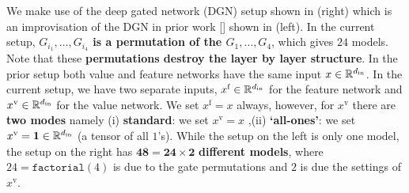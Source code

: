 We make use of the deep gated network (DGN) setup shown in  (right) which is an improvisation of the DGN in prior work [] shown in  (left). In the current setup, {\bf{$G_{i_1},\ldots,G_{i_4}$ is a permutation of the $G_1,\ldots,G_4$}}, which gives $24$ models. Note that these \textbf{permutations destroy the layer by layer structure}. In the prior setup both value and feature networks have the same input $x\in\mathbb{R}^{d_{\text{in}}}$. In the current setup, we have two separate inputs, $x^{\text{f}}\in\mathbb{R}^{d_{\text{in}}}$ for the feature network and $x^{\text{v}}\in\mathbb{R}^{d_{\text{in}}}$ for the value network. We set $x^{\text{f}}=x$ always, however, for $x^{\text{v}}$ there are \textbf{two modes} namely (i) \textbf{standard}: we set $x^{\text{v}}=x$ ,(ii) \textbf{`all-ones'}: we set $x^{\text{v}}=\mathbf{1}\in\mathbb{R}^{d_{\text{in}}}$ (a tensor of all $1$'s). While the setup on the left is only one model, the setup on the right has $\mathbf{48=24\times 2}$ \textbf{different models}, where $24=\texttt{factorial}(4)$ is due to the gate permutations and $2$ is due the settings of $x^{\text{v}}$.

